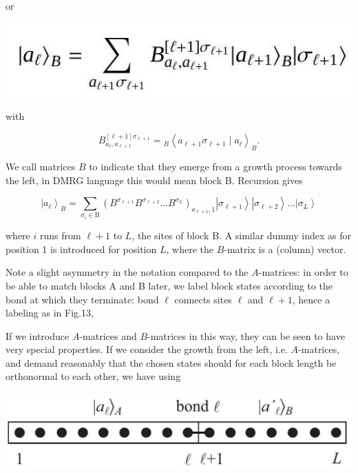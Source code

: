 \documentclass[12pt]{article}
\begin{document}
or

\begin{center}
\includegraphics[max width=\textwidth]{2024_05_04_afc4ad226da9ccfe0ac8g-027(1)}
\end{center}

with


\begin{equation*}
B_{a_{\ell}, a_{\ell+1}}^{[\ell+1] \sigma_{\ell+1}}={ }_{B}\left\langle a_{\ell+1} \sigma_{\ell+1} \mid a_{\ell}\right\rangle_{B} . \tag{66}
\end{equation*}


We call matrices $B$ to indicate that they emerge from a growth process towards the left, in DMRG language this would mean block B. Recursion gives


\begin{equation*}
\left|a_{\ell}\right\rangle_{B}=\sum_{\sigma_{i} \in \mathrm{B}}\left(B^{\sigma_{\ell+1}} B^{\sigma_{\ell+2}} \ldots B^{\sigma_{L}}\right)_{a_{\ell+1}, 1}\left|\sigma_{\ell+1}\right\rangle\left|\sigma_{\ell+2}\right\rangle \ldots\left|\sigma_{L}\right\rangle \tag{67}
\end{equation*}


where $i$ runs from $\ell+1$ to $L$, the sites of block B. A similar dummy index as for position 1 is introduced for position $L$, where the $B$-matrix is a (column) vector.

Note a slight asymmetry in the notation compared to the $A$-matrices: in order to be able to match blocks A and B later, we label block states according to the bond at which they terminate: bond $\ell$ connects sites $\ell$ and $\ell+1$, hence a labeling as in Fig.13,

If we introduce $A$-matrices and $B$-matrices in this way, they can be seen to have very special properties. If we consider the growth from the left, i.e. $A$-matrices, and demand reasonably that the chosen states should for each block length be orthonormal to each other, we have using

\begin{center}
\includegraphics[max width=\textwidth]{2024_05_04_afc4ad226da9ccfe0ac8g-028(1)}
\end{center}
\end{document}
